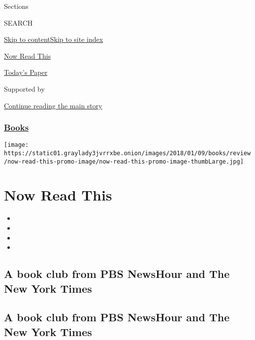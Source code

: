 Sections

SEARCH

\protect\hyperlink{site-content}{Skip to
content}\protect\hyperlink{site-index}{Skip to site index}

\href{https://www.nytimes3xbfgragh.onion/spotlight/now-read-this}{Now
Read This}

\href{https://myaccount.nytimes3xbfgragh.onion/auth/login?response_type=cookie\&client_id=vi}{}

\href{https://www.nytimes3xbfgragh.onion/section/todayspaper}{Today's
Paper}

Supported by

\protect\hyperlink{after-sponsor}{Continue reading the main story}

\hypertarget{books}{%
\subsubsection{\texorpdfstring{\href{/section/books}{Books}}{Books}}\label{books}}

\texttt{[image: https://static01.graylady3jvrrxbe.onion/images/2018/01/09/books/review/now-read-this-promo-image/now-read-this-promo-image-thumbLarge.jpg]}

\hypertarget{now-read-this}{%
\section{Now Read This}\label{now-read-this}}

\begin{itemize}
\item
\item
\item
\item
\end{itemize}

\hypertarget{a-book-club-from-pbs-newshour-and-the-new-york-times}{%
\subsection{A book club from PBS NewsHour and The New York
Times}\label{a-book-club-from-pbs-newshour-and-the-new-york-times}}

\hypertarget{a-book-club-from-pbs-newshour-and-the-new-york-times-1}{%
\subsection{A book club from PBS NewsHour and The New York
Times}\label{a-book-club-from-pbs-newshour-and-the-new-york-times-1}}

